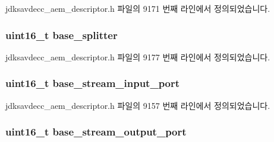 jdksavdecc\+\_\+aem\+\_\+descriptor.\+h 파일의 9171 번째 라인에서 정의되었습니다.

\subsubsection[{\texorpdfstring{base\+\_\+splitter}{base_splitter}}]{\setlength{\rightskip}{0pt plus 5cm}uint16\+\_\+t base\+\_\+splitter}\hypertarget{structjdksavdecc__descriptor__video__unit_a7a10a93a209406b90273d791f69a4421}{}\label{structjdksavdecc__descriptor__video__unit_a7a10a93a209406b90273d791f69a4421}


jdksavdecc\+\_\+aem\+\_\+descriptor.\+h 파일의 9177 번째 라인에서 정의되었습니다.

\subsubsection[{\texorpdfstring{base\+\_\+stream\+\_\+input\+\_\+port}{base_stream_input_port}}]{\setlength{\rightskip}{0pt plus 5cm}uint16\+\_\+t base\+\_\+stream\+\_\+input\+\_\+port}\hypertarget{structjdksavdecc__descriptor__video__unit_a8ad4ba35aee3ad22d5e946438bbaba53}{}\label{structjdksavdecc__descriptor__video__unit_a8ad4ba35aee3ad22d5e946438bbaba53}


jdksavdecc\+\_\+aem\+\_\+descriptor.\+h 파일의 9157 번째 라인에서 정의되었습니다.

\subsubsection[{\texorpdfstring{base\+\_\+stream\+\_\+output\+\_\+port}{base_stream_output_port}}]{\setlength{\rightskip}{0pt plus 5cm}uint16\+\_\+t base\+\_\+stream\+\_\+output\+\_\+port}\hypertarget{structjdksavdecc__descriptor__video__unit_a234b990d7bb2f22da0ba4bebadc71a70}{}\label{structjdksavdecc__descriptor__video__unit_a234b990d7bb2f22da0ba4bebadc71a70}


